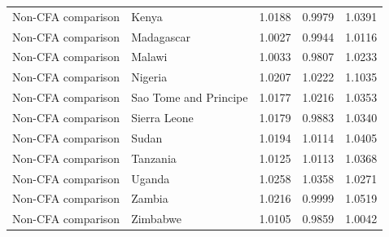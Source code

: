 \begin{table}
\begin{tabular}[t]{llrrr}
Non-CFA comparison & Kenya & 1.0188 & 0.9979 & 1.0391\\
\addlinespace
Non-CFA comparison & Madagascar & 1.0027 & 0.9944 & 1.0116\\
Non-CFA comparison & Malawi & 1.0033 & 0.9807 & 1.0233\\
Non-CFA comparison & Nigeria & 1.0207 & 1.0222 & 1.1035\\
Non-CFA comparison & Sao Tome and Principe & 1.0177 & 1.0216 & 1.0353\\
Non-CFA comparison & Sierra Leone & 1.0179 & 0.9883 & 1.0340\\
\addlinespace
Non-CFA comparison & Sudan & 1.0194 & 1.0114 & 1.0405\\
Non-CFA comparison & Tanzania & 1.0125 & 1.0113 & 1.0368\\
Non-CFA comparison & Uganda & 1.0258 & 1.0358 & 1.0271\\
Non-CFA comparison & Zambia & 1.0216 & 0.9999 & 1.0519\\
Non-CFA comparison & Zimbabwe & 1.0105 & 0.9859 & 1.0042\\
\bottomrule
\end{tabular}
\end{table}